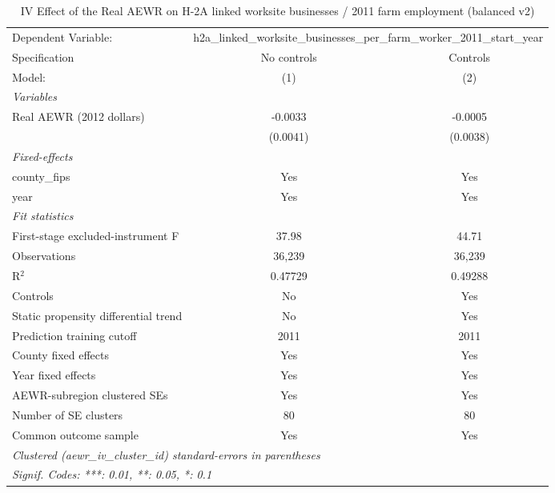 
\begin{table}[htbp]
   \caption{\label{tab:iv_h2a_linked_worksite_businesses} IV Effect of the Real AEWR on H-2A linked worksite businesses / 2011 farm employment (balanced v2)}
   \centering
   \begin{tabular}{lcc}
      \tabularnewline \midrule \midrule
      Dependent Variable: & \multicolumn{2}{c}{h2a\_linked\_worksite\_businesses\_per\_farm\_worker\_2011\_start\_year}\\
      Specification                        & No controls & Controls \\
      Model:                               & (1)         & (2)\\
      \midrule
      \emph{Variables}\\
      Real AEWR (2012 dollars)             & -0.0033     & -0.0005\\
                                           & (0.0041)    & (0.0038)\\
      \midrule
      \emph{Fixed-effects}\\
      county\_fips                         & Yes         & Yes\\
      year                                 & Yes         & Yes\\
      \midrule
      \emph{Fit statistics}\\
      First-stage excluded-instrument F    & 37.98       & 44.71\\
      Observations                         & 36,239      & 36,239\\
      R$^2$                                & 0.47729     & 0.49288\\
      Controls                             & No          & Yes\\
      Static propensity differential trend & No          & Yes\\
      Prediction training cutoff           & 2011        & 2011\\
      County fixed effects                 & Yes         & Yes\\
      Year fixed effects                   & Yes         & Yes\\
      AEWR-subregion clustered SEs         & Yes         & Yes\\
      Number of SE clusters                & 80          & 80\\
      Common outcome sample                & Yes         & Yes\\
      \midrule \midrule
      \multicolumn{3}{l}{\emph{Clustered (aewr\_iv\_cluster\_id) standard-errors in parentheses}}\\
      \multicolumn{3}{l}{\emph{Signif. Codes: ***: 0.01, **: 0.05, *: 0.1}}\\
   \end{tabular}


\end{table}
